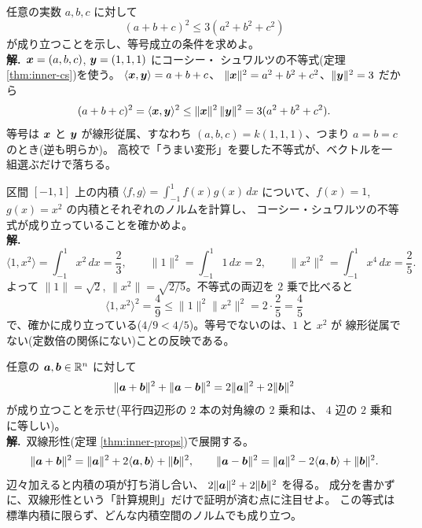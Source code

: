 \begin{rei}\label{rei:inner-csapp}
任意の実数 $a, b, c$ に対して
\[
(a + b + c)^2 \le 3(a^2 + b^2 + c^2)
\]
が成り立つことを示し、等号成立の条件を求めよ。\\
\textbf{解.}\ $\bm{x} = (a, b, c)$, $\bm{y} = (1, 1, 1)$ にコーシー・
シュワルツの不等式(定理 \ref{thm:inner-cs})を使う。
$\langle \bm{x}, \bm{y} \rangle = a + b + c$、
$\|\bm{x}\|^2 = a^2 + b^2 + c^2$、$\|\bm{y}\|^2 = 3$ だから
\[
(a + b + c)^2 = \langle \bm{x}, \bm{y} \rangle^2
\le \|\bm{x}\|^2\,\|\bm{y}\|^2 = 3(a^2 + b^2 + c^2).
\]
等号は $\bm{x}$ と $\bm{y}$ が線形従属、すなわち
$(a, b, c) = k(1, 1, 1)$、つまり $a = b = c$ のとき(逆も明らか)。
高校で「うまい変形」を要した不等式が、ベクトルを一組選ぶだけで落ちる。
\end{rei}

\begin{rei}[例題・標準(関数の内積)]\label{rei:inner-funccalc}
区間 $[-1, 1]$ 上の内積 $\langle f, g \rangle = \int_{-1}^{1} f(x)g(x)\,dx$
について、$f(x) = 1$, $g(x) = x^2$ の内積とそれぞれのノルムを計算し、
コーシー・シュワルツの不等式が成り立っていることを確かめよ。\\
\textbf{解.}\
\[
\langle 1, x^2 \rangle = \int_{-1}^{1} x^2\,dx = \frac{2}{3}, \qquad
\|1\|^2 = \int_{-1}^{1} 1\,dx = 2, \qquad
\|x^2\|^2 = \int_{-1}^{1} x^4\,dx = \frac{2}{5}.
\]
よって $\|1\| = \sqrt{2}$, $\|x^2\| = \sqrt{2/5}$。不等式の両辺を
$2$ 乗で比べると
\[
\langle 1, x^2 \rangle^2 = \frac{4}{9} \le \|1\|^2\|x^2\|^2
= 2 \cdot \frac{2}{5} = \frac{4}{5}
\]
で、確かに成り立っている($4/9 < 4/5$)。等号でないのは、$1$ と $x^2$ が
線形従属でない(定数倍の関係にない)ことの反映である。
\end{rei}

\begin{rei}[例題・標準(証明:平行四辺形の法則)]\label{rei:inner-parallelogram}
任意の $\bm{a}, \bm{b} \in \mathbb{R}^n$ に対して
\[
\|\bm{a} + \bm{b}\|^2 + \|\bm{a} - \bm{b}\|^2
= 2\|\bm{a}\|^2 + 2\|\bm{b}\|^2
\]
が成り立つことを示せ(平行四辺形の $2$ 本の対角線の $2$ 乗和は、
$4$ 辺の $2$ 乗和に等しい)。\\
\textbf{解.}\ 双線形性(定理 \ref{thm:inner-props})で展開する。
\[
\|\bm{a} + \bm{b}\|^2 = \|\bm{a}\|^2 + 2\langle \bm{a}, \bm{b} \rangle
+ \|\bm{b}\|^2, \qquad
\|\bm{a} - \bm{b}\|^2 = \|\bm{a}\|^2 - 2\langle \bm{a}, \bm{b} \rangle
+ \|\bm{b}\|^2.
\]
辺々加えると内積の項が打ち消し合い、
$2\|\bm{a}\|^2 + 2\|\bm{b}\|^2$ を得る。
成分を書かずに、双線形性という「計算規則」だけで証明が済む点に注目せよ。
この等式は標準内積に限らず、どんな内積空間のノルムでも成り立つ。
\end{rei}

